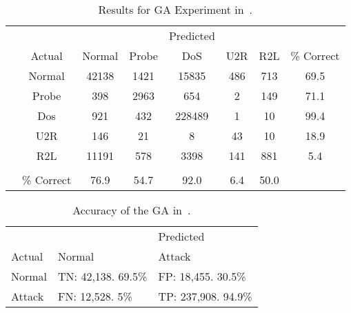 \documentclass{sig-alternate}
\begin{document}
\begin{table*}
\center
\caption{Results for GA Experiment in~\cite{DBLP:journals/corr/abs-1204-1336}.}
\vspace{0.20cm}
\begin{tabular}{cc|cccccc}
& & & & Predicted & & & \\
& Actual & Normal & Probe & DoS & U2R & R2L & \% Correct \\ \cline{3-8}
& Normal & 42138 & 1421 & 15835 & 486 & 713 & 69.5\\
& Probe & 398 & 2963 & 654 & 2 & 149 & 71.1   \\
& Dos & 921 & 432 & 228489 & 1 & 10 & 99.4\\
& U2R & 146 & 21 & 8 & 43 & 10 & 18.9\\
& R2L & 11191 & 578 & 3398 & 141 & 881 & 5.4\\
&& &&&&& \\
& \% Correct &  76.9 & 54.7 & 92.0 & 6.4 & 50.0 & \\
\end{tabular}
\center
\label{tab:genAlgResults}
\end{table*}





\begin{table}
\center
\caption{Accuracy of the GA in~\cite{DBLP:journals/corr/abs-1204-1336}.}
\vspace{0.20cm}
\begin{tabular}{l|ll}
& & Predicted\\
Actual & Normal & Attack \\ \cline{2-3}
Normal & TN: 42,138. 69.5\% & FP: 18,455. 30.5\% \\
Attack & FN: 12,528. 5\% & TP: 237,908. 94.9\%  \\
\end{tabular}
\center
\label{tab:genAlgResults2}
\end{table}
\end{document}
